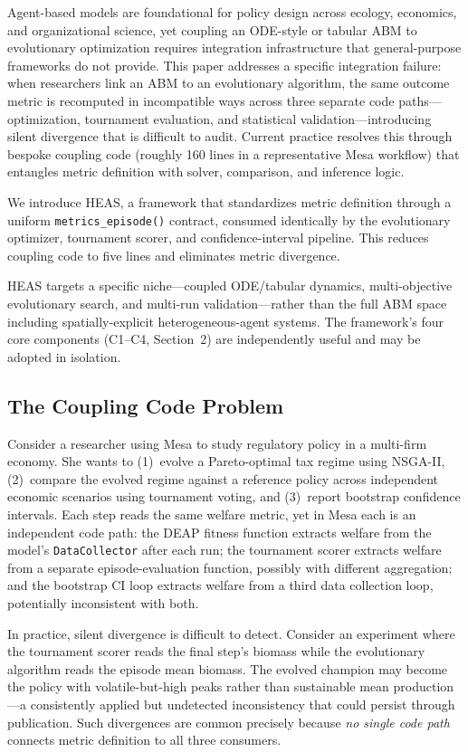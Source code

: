 \documentclass{wscpaperproc}
\begin{document}
Agent-based models are foundational for policy design across ecology,
economics, and organizational science, yet coupling an ODE-style or tabular ABM
to evolutionary optimization requires integration infrastructure that
general-purpose frameworks do not provide. This paper addresses a specific
integration failure: when researchers link an ABM to an evolutionary algorithm,
the same outcome metric is recomputed in incompatible ways across three separate
code paths---optimization, tournament evaluation, and statistical
validation---introducing silent divergence that is difficult to audit. Current
practice resolves this through bespoke coupling code (roughly 160 lines in a
representative Mesa workflow) that entangles metric definition with solver,
comparison, and inference logic.

We introduce HEAS, a framework that standardizes metric definition through a
uniform \texttt{metrics\_episode()} contract, consumed identically by the
evolutionary optimizer, tournament scorer, and confidence-interval pipeline.
This reduces coupling code to five lines and eliminates metric divergence.

HEAS targets a specific niche---coupled ODE/tabular dynamics, multi-objective
evolutionary search, and multi-run validation---rather than the full ABM space
including spatially-explicit heterogeneous-agent systems. The framework's four
core components (C1--C4, Section~2) are independently useful and may be adopted
in isolation.

\subsection{The Coupling Code Problem}

Consider a researcher using Mesa to study regulatory policy in a multi-firm
economy. She wants to (1)~evolve a Pareto-optimal tax regime using NSGA-II,
(2)~compare the evolved regime against a reference policy across independent
economic scenarios using tournament voting, and (3)~report bootstrap confidence
intervals. Each step reads the same welfare metric, yet in Mesa each is an
independent code path: the DEAP fitness function extracts welfare from the
model's \texttt{DataCollector} after each run; the tournament scorer extracts
welfare from a separate episode-evaluation function, possibly with different
aggregation; and the bootstrap CI loop extracts welfare from a third data
collection loop, potentially inconsistent with both.

In practice, silent divergence is difficult to detect. Consider an experiment
where the tournament scorer reads the final step's biomass while the
evolutionary algorithm reads the episode mean biomass. The evolved champion may
become the policy with volatile-but-high peaks rather than sustainable mean
production---a consistently applied but undetected inconsistency that could
persist through publication. Such divergences are common precisely because
\emph{no single code path} connects metric definition to all three consumers.
\end{document}
